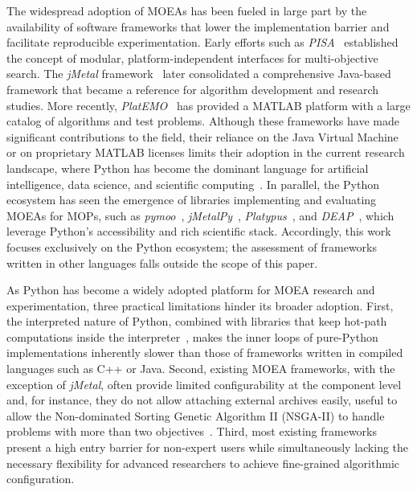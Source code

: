\documentclass[final,5p,times,twocolumn]{elsarticle}
\begin{document}
The widespread adoption of MOEAs has been fueled in large part by the availability of software frameworks that lower the implementation barrier and facilitate reproducible experimentation. Early efforts such as \textit{PISA}~\cite{BLT+03} established the concept of modular, platform-independent interfaces for multi-objective search. The \textit{jMetal} framework~\cite{DN11} later consolidated a comprehensive Java-based framework that became a reference for algorithm development and research studies. More recently, \textit{PlatEMO}~\cite{TCZ+17} has provided a MATLAB platform with a large catalog of algorithms and test problems. Although these frameworks have made significant contributions to the field, their reliance on the Java Virtual Machine or on proprietary MATLAB licenses limits their adoption in the current research landscape, where Python has become the dominant language for artificial intelligence, data science, and scientific computing~\cite{HMV+20}. In parallel, the Python ecosystem has seen the emergence of libraries implementing and evaluating MOEAs for MOPs, such as \textit{pymoo}~\cite{BD20}, \textit{jMetalPy}~\cite{BNG+19}, \textit{Platypus}~\cite{hadka15}, and \textit{DEAP}~\cite{FDG+12}, which leverage Python's accessibility and rich scientific stack. Accordingly, this work focuses exclusively on the Python ecosystem; the assessment of frameworks written in other languages falls outside the scope of this paper. 

As Python has become a widely adopted platform for MOEA research and experimentation, three practical limitations hinder its broader adoption. First, the interpreted nature of Python, combined with libraries that keep hot-path computations inside the interpreter~\cite{BNG+19,FDG+12,hadka15}, makes the inner loops of pure-Python implementations inherently slower than those of frameworks written in compiled languages such as C++ or Java. Second, existing MOEA frameworks, with the exception of \textit{jMetal}, often provide limited configurability at the component level and, for instance, they do not allow attaching external archives easily, useful to allow the Non-dominated Sorting Genetic Algorithm II (NSGA-II) to handle problems with more than two objectives~\cite{IPS20}. Third, most existing frameworks present a high entry barrier for non-expert users while simultaneously lacking the necessary flexibility for advanced researchers to achieve fine-grained algorithmic configuration. 
\end{document}
